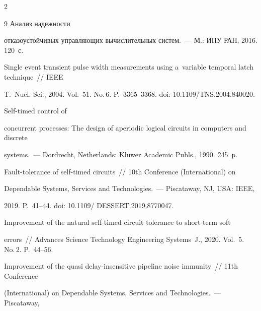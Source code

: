 \begin{multicols}{2}
{{\begin{thebibliography}{9}
   Анализ надежности 

отказоустойчивых управ\-ля\-ющих вы\-чис\-ли\-тель\-ных сис\-тем.~--- М.: ИПУ РАН, 2016. 120~с. 




Single event transient pulse width measurements using a~variable temporal latch technique~// IEEE 

T.~Nucl. Sci., 2004. Vol.~51. No.\,6. P.~3365--3368. doi: 10.1109/TNS.2004.840020.


   Self-timed control of 

concurrent processes: The design of aperiodic logical circuits in computers and discrete  

systems.~--- Dordrecht, Netherlands: Kluwer Academic Publs., 1990. 245~p.


   Fault-tolerance of self-timed circuits~// 10th Conference (International) on 

Dependable Systems, Services and Technologies.~--- Piscataway, NJ, USA: IEEE, 

2019. P.~41--44. doi: 10.1109/ DESSERT.2019.8770047.


   Improvement of the natural self-timed circuit tolerance to short-term soft 

errors~// Advances Science Technology Engineering Systems~J., 2020. Vol.~5. No.\,2. P.~44--56.



Improvement of the quasi delay-insensitive pipeline noise immunity~// 11th Conference 

(International)  on Dependable Systems, Services and Technologies.~--- Piscataway, 


\end{thebibliography}}}
\end{multicols}
